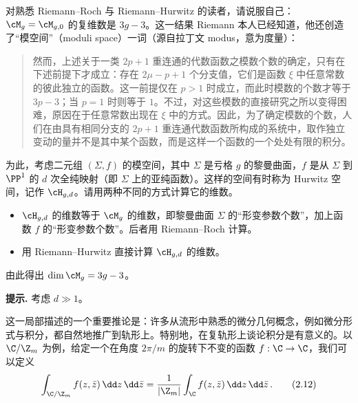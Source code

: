 \begin{exercise}[2.2]
  对熟悉 Riemann–Roch 与 Riemann–Hurwitz 的读者，请说服自己：$\cM_g=\cM_{g,0}$ 的复维数是 $3g-3$。这一结果 Riemann 本人已经知道，他还创造了“模空间”（moduli space）一词（源自拉丁文 modus，意为度量）：

  \begin{quote}\small
    然而，上述关于一类 $2p+1$ 重连通的代数函数之模数个数的确定，只有在下述前提下才成立：存在 $2\mu-p+1$ 个分支值，它们是函数 $\xi$ 中任意常数的彼此独立的函数。这一前提仅在 $p>1$ 时成立，而此时模数的个数才等于 $3p-3$；当 $p=1$ 时则等于 $1$。不过，对这些模数的直接研究之所以变得困难，原因在于任意常数出现在 $\xi$ 中的方式。因此，为了确定模数的个数，人们在由具有相同分支的 $2p+1$ 重连通代数函数所构成的系统中，取作独立变动的量并不是其中某个函数，而是这样一个函数的一个处处有限的积分。
  \end{quote}

  为此，考虑二元组 $(\Sigma,f)$ 的模空间，其中 $\Sigma$ 是亏格 $g$ 的黎曼曲面，$f$ 是从 $\Sigma$ 到 $\PP^1$ 的 $d$ 次全纯映射（即 $\Sigma$ 上的亚纯函数）。这样的空间有时称为 Hurwitz 空间，记作 $\cH_{g,d}$。请用两种不同的方式计算它的维数。
  \begin{itemize}
    \item $\cH_{g,d}$ 的维数等于 $\cM_g$ 的维数，即黎曼曲面 $\Sigma$ 的“形变参数个数”，加上函数 $f$ 的“形变参数个数”。后者用 Riemann–Roch 计算。
    \item 用 Riemann–Hurwitz 直接计算 $\cH_{g,d}$ 的维数。
  \end{itemize}
  由此得出 $\dim\cM_g=3g-3$。

  \textbf{提示.} 考虑 $d\gg 1$。
\end{exercise}

这一局部描述的一个重要推论是：许多从流形中熟悉的微分几何概念，例如微分形式与积分，都自然地推广到轨形上。特别地，在复轨形上谈论积分是有意义的。以 $\C/\Z_m$ 为例，给定一个在角度 $2\pi/m$ 的旋转下不变的函数 $f:\C\to\C$，我们可以定义
\begin{equation}
  \int_{\C/\Z_m}f(z,\bar z)\,\dd z\,\dd\bar z
  =\frac{1}{|\Z_m|}\int_{\C}f(z,\bar z)\,\dd z\,\dd\bar z\,.
  \tag{2.12}
\end{equation}

